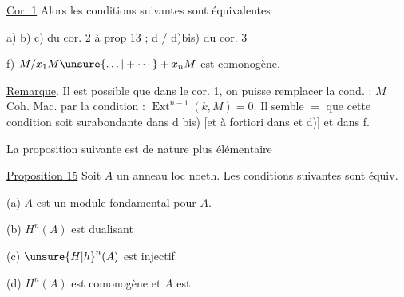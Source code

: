  

\uline{Cor. 1}   Alors les conditions  suivantes sont équivalentes 

a) b) c) du cor. 2 à prop 13 ; d / d)bis) du cor. 3






f) $M/x_1M\unsure{\ldots|+\cdots} + x_nM$  est comonogène.

\uline{Remarque}. Il est possible que dans le cor. 1,  on puisse remplacer  la cond. : $M$ Coh. Mac. par la condition : $\operatorname{Ext}^{n-1}(k,M)=0$. Il semble $=$ que cette condition soit surabondante dans d bis)  [et à fortiori dans  et d)]  et  dans f.

La proposition suivante est de nature plus élémentaire

\uline{Proposition 15} Soit $A$ un anneau loc noeth. Les conditions suivantes sont équiv.

(a) $A$ est un module fondamental pour $A$.

(b) $H^n(A)$ est dualisant

(c) ${\unsure{H|h}}^n(A)$ est injectif

(d) $H^n(A)$ est comonogène et $A$ est 

